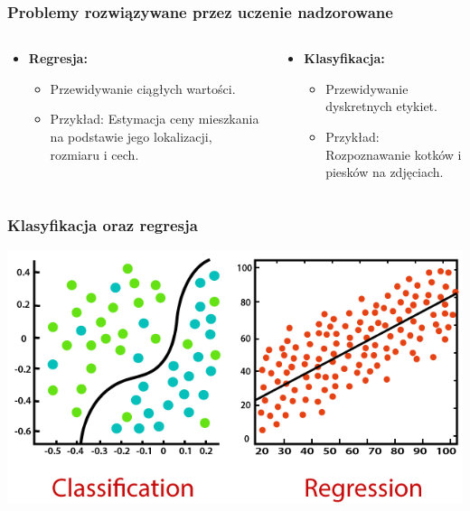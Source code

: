 \documentclass[smaller]{beamer}
\begin{document}
\begin{frame}
\frametitle{Problemy rozwiązywane przez uczenie nadzorowane}

\begin{columns}
    \begin{column}{0.5\textwidth}
        \begin{itemize}
            \item \textbf{Regresja:}
                \begin{itemize}
                    \item Przewidywanie ciągłych wartości.
                    \item Przykład: Estymacja ceny mieszkania na podstawie jego lokalizacji, rozmiaru i cech.
                \end{itemize}
        \end{itemize}
    \end{column}

    \begin{column}{0.5\textwidth}
        \begin{itemize}
            \item \textbf{Klasyfikacja:}
                \begin{itemize}
                    \item Przewidywanie dyskretnych etykiet.
                    \item Przykład: Rozpoznawanie kotków i piesków na zdjęciach.
                \end{itemize}
        \end{itemize}
    \end{column}
\end{columns}

\end{frame}


\begin{frame}
\frametitle{Klasyfikacja oraz regresja}
\includegraphics[width=\textwidth,height=0.8\textheight,keepaspectratio]{../manifest/regression-classification-1.png}
\end{frame}
\end{document}
